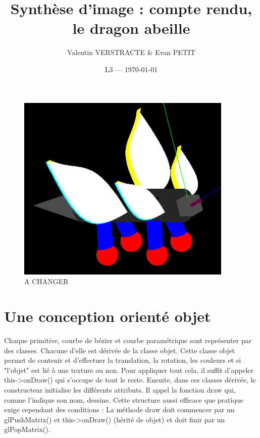 \documentclass{article}
\title{Synthèse d'image : compte rendu, le dragon abeille} %
\author{Valentin VERSTRACTE \& Evan PETIT}
\date{L3 --- \today} %
\begin{document}
\maketitle %


\renewcommand{\contentsname}{Table des matières}
\tableofcontents


\begin{figure}[!htb]
	\centering
    	\includegraphics[height=9cm]{./assets/dragon_abeille.png}
    	\caption{A CHANGER}
    	\label{fig:dragon_abeille}
\end{figure}


\section{Une conception orienté objet} %

Chaque primitive, courbe de bézier et courbe paramétrique sont représenter par des classes. Chacune d'elle est dérivée de la classe objet. Cette classe objet permet de contenir et d'effectuer la translation, la rotation, les couleurs et si "l'objet" est lié à une texture ou non. Pour appliquer tout cela, il suffit d'appeler this->onDraw() qui s'occupe de tout le reste. Ensuite, dans ces classes dérivée, le constructeur initialise les différents attributs. Il appel la fonction draw qui, comme l'indique son nom, dessine. Cette structure aussi efficace que pratique exige cependant des conditions : La méthode draw doit commencer par un glPushMatrix() et this->onDraw() (hérité de objet) et doit finir par un glPopMatrix(). 
\end{document}
